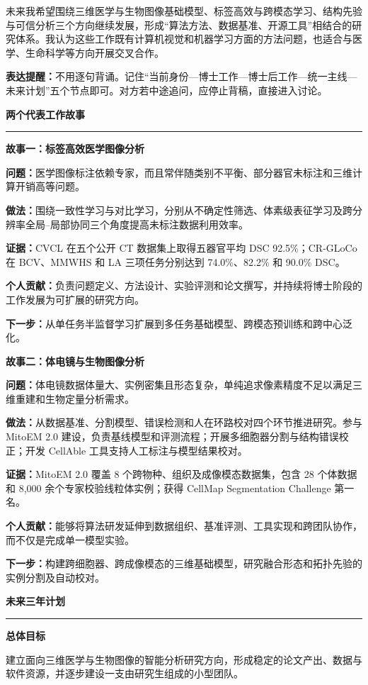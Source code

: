 \documentclass[11pt,a4paper]{ctexart}
\newcommand{\sectionbar}[1]{%
  \vspace{0.35em}
  {\large\bfseries\sffamily\color{accent} #1}\par
  \vspace{-0.35em}\color{accent}\rule{\textwidth}{0.7pt}\color{black}\vspace{0.2em}
}
\newcommand{\prompt}[1]{\textbf{\color{accent}#1}}
\newcommand{\note}[1]{%
  \begin{center}
  \colorbox{light}{\parbox{0.94\textwidth}{#1}}
  \end{center}
}
\begin{document}
未来我希望围绕三维医学与生物图像基础模型、标签高效与跨模态学习、结构先验与可信分析三个方向继续发展，形成“算法方法、数据基准、开源工具”相结合的研究体系。我认为这些工作既有计算机视觉和机器学习方面的方法问题，也适合与医学、生命科学等方向开展交叉合作。

\note{\textbf{表达提醒：}不用逐句背诵。记住“当前身份—博士工作—博士后工作—统一主线—未来计划”五个节点即可。对方若中途追问，应停止背稿，直接进入讨论。}

\sectionbar{两个代表工作故事}

\prompt{故事一：标签高效医学图像分析}

\textbf{问题：}医学图像标注依赖专家，而且常伴随类别不平衡、部分器官未标注和三维计算开销高等问题。

\textbf{做法：}围绕一致性学习与对比学习，分别从不确定性筛选、体素级表征学习及跨分辨率全局--局部协同三个角度提高未标注数据利用效率。

\textbf{证据：}CVCL 在五个公开 CT 数据集上取得五器官平均 DSC 92.5\%；CR-GLoCo 在 BCV、MMWHS 和 LA 三项任务分别达到 74.0\%、82.2\% 和 90.0\% DSC。

\textbf{个人贡献：}负责问题定义、方法设计、实验评测和论文撰写，并持续将博士阶段的工作发展为可扩展的研究方向。

\textbf{下一步：}从单任务半监督学习扩展到多任务基础模型、跨模态预训练和跨中心泛化。

\newpage
\prompt{故事二：体电镜与生物图像分析}

\textbf{问题：}体电镜数据体量大、实例密集且形态复杂，单纯追求像素精度不足以满足三维重建和生物定量分析需求。

\textbf{做法：}从数据基准、分割模型、错误检测和人在环路校对四个环节推进研究。参与 MitoEM 2.0 建设，负责基线模型和评测流程；开展多细胞器分割与结构错误校正；开发 CellAble 工具支持人工标注与模型结果校对。

\textbf{证据：}MitoEM 2.0 覆盖 8 个跨物种、组织及成像模态数据集，包含 28 个体数据和 8,000 余个专家校验线粒体实例；获得 CellMap Segmentation Challenge 第一名。

\textbf{个人贡献：}能够将算法研发延伸到数据组织、基准评测、工具实现和跨团队协作，而不仅是完成单一模型实验。

\textbf{下一步：}构建跨细胞器、跨成像模态的三维基础模型，研究融合形态和拓扑先验的实例分割及自动校对。

\sectionbar{未来三年计划}

\prompt{总体目标}

建立面向三维医学与生物图像的智能分析研究方向，形成稳定的论文产出、数据与软件资源，并逐步建设一支由研究生组成的小型团队。
\end{document}
